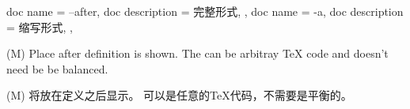 \begin{docKeys}[
    doc no index,   %
    doc parameter = {~\meta{code}},
    ]
    {
    {
        doc name        = --after,
        doc description = 完整形式,
    },
    {
        doc name        = -a,
        doc description = 缩写形式,
    },
    }
    
(M) 
Place  after definition is shown.
    The  can be arbitray TeX code and doesn't need be be balanced.
    
(M) 将放在定义之后显示。
可以是任意的TeX代码，不需要是平衡的。
    
\end{docKeys}
    
    